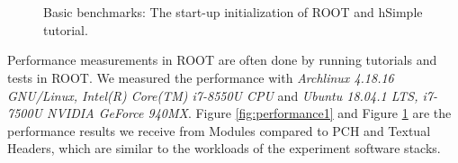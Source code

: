 \documentclass{webofc}
\begin{document}
\begin{figure}
\centering
    \begin{minipage}{.48\textwidth}
 　 \end{minipage}\hfill
    \begin{minipage}{.48\textwidth}
 　 \end{minipage}
\caption{Basic benchmarks: The start-up initialization of ROOT and hSimple tutorial.} 
\label{fig:performance2}
\end{figure}

Performance measurements in ROOT are often done by running tutorials and tests in ROOT.
We measured the performance with {\it Archlinux 4.18.16 GNU/Linux, Intel(R) Core(TM) i7-8550U CPU} and {\it Ubuntu 18.04.1 LTS, i7-7500U NVIDIA GeForce 940MX}.
Figure \ref{fig:performance1} and Figure \ref{fig:performance2} are the performance results we receive from Modules compared to PCH and Textual Headers, which are similar to the workloads of the experiment software stacks.
\end{document}
